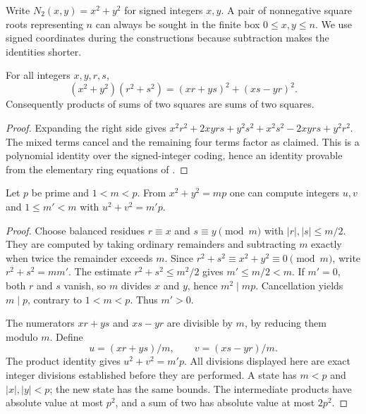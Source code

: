 Write $N_2(x,y)=x^2+y^2$ for signed integers $x,y$.  A pair of
nonnegative square roots representing $n$ can always be sought in the
finite box $0\le x,y\le n$.  We use signed coordinates during the
constructions because subtraction makes the identities shorter.

\begin{lemma}\label{qr:two-product}
For all integers $x,y,r,s$,
\[
 (x^2+y^2)(r^2+s^2)=(xr+ys)^2+(xs-yr)^2.
\]
Consequently products of sums of two squares are sums of two squares.
\end{lemma}
\begin{proof}
Expanding the right side gives $x^2r^2+2xyrs+y^2s^2+x^2s^2-2xyrs+y^2r^2$.
The mixed terms cancel and the remaining four terms factor as claimed.
This is a polynomial identity over the signed-integer coding, hence an
identity provable from the elementary ring equations of \ipra.
\end{proof}

\begin{lemma}\label{qr:two-descent}
Let $p$ be prime and $1<m<p$. From $x^2+y^2=mp$ one can compute
integers $u,v$ and $1\le m'<m$ with $u^2+v^2=m'p$.
\end{lemma}
\begin{proof}
Choose balanced residues $r\equiv x$ and $s\equiv y\pmod m$ with
$|r|,|s|\le m/2$. They are computed by taking ordinary remainders
and subtracting $m$ exactly when twice the remainder exceeds $m$.
Since $r^2+s^2\equiv x^2+y^2\equiv0\pmod m$, write
$r^2+s^2=mm'$. The estimate $r^2+s^2\le m^2/2$ gives
$m'\le m/2<m$. If $m'=0$, both $r$ and $s$ vanish, so $m$ divides
$x$ and $y$, hence $m^2\mid mp$. Cancellation yields $m\mid p$,
contrary to $1<m<p$. Thus $m'>0$.

The numerators $xr+ys$ and $xs-yr$ are divisible by $m$, by reducing
them modulo $m$. Define
\[
 u=(xr+ys)/m,\qquad v=(xs-yr)/m.
\]
The product identity gives $u^2+v^2=m'p$. All divisions displayed here
are exact integer divisions established before they are performed.
A state has $m<p$ and $|x|,|y|<p$; the new state has the same bounds.
The intermediate products have absolute value at most $p^2$, and a
sum of two has absolute value at most $2p^2$.
\end{proof}

